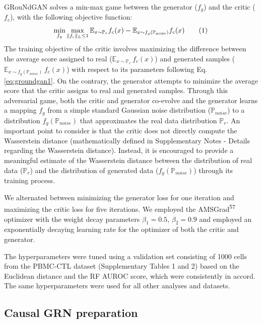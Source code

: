 GRouNdGAN solves a min-max game between the generator (${f}_{g}$) and the critic (${f}_{c}$), with the following objective function:
\begin{equation} 
\min_{f_g} \max_{\| f_c \|_L \le 1} 
\mathbb{E}_{x \sim \mathbb{P}_r} f_c(x) - 
\mathbb{E}_{x \sim f_g(\mathbb{P}_{\rm noise})} f_c(x)
\tag{1}\label{eq:groundgan1} 
\end{equation}
The training objective of the critic involves maximizing the difference between the average score assigned to real (${{\mathbb{E}}}_{x \sim {{\mathbb{P}}}_{r}} \, {f}_{c}\left(x\right)$) and generated samples (${{\mathbb{E}}}_{x \sim {f}_{g}\left({{\mathbb{P}}}_{{noise}}\right)} \, {f}_{c}\left(x\right)$) with respect to its parameters following Eq. \eqref{eq:groundgan1}. On the contrary, the generator attempts to minimize the average score that the critic assigns to real and generated samples. Through this adversarial game, both the critic and generator co-evolve and the generator learns a mapping ${f}_{g}$ from a simple standard Gaussian noise distribution (${{\mathbb{P}}}_{{noise}}$) to a distribution ${f}_{g}\left({{\mathbb{P}}}_{{noise}}\right)$ that approximates the real data distribution ${{\mathbb{P}}}_{r}$. An important point to consider is that the critic does not directly compute the Wasserstein distance (mathematically defined in Supplementary Notes - Details regarding the Wasserstein distance). Instead, it is encouraged to provide a meaningful estimate of the Wasserstein distance between the distribution of real data (${{\mathbb{P}}}_{r}$) and the distribution of generated data (${f}_{g}\left({{\mathbb{P}}}_{{noise}}\right)$) through its training process.

We alternated between minimizing the generator loss for one iteration and maximizing the critic loss for five iterations. We employed the AMSGrad\textsuperscript{57} optimizer with the weight decay parameters ${\beta }_{1}=0.5$, ${\beta }_{2}=0.9$ and employed an exponentially decaying learning rate for the optimizer of both the critic and generator.

The hyperparameters were tuned using a validation set consisting of 1000 cells from the PBMC-CTL dataset (Supplementary Tables 1 and 2) based on the Euclidean distance and the RF AUROC score, which were consistently in accord. The same hyperparameters were used for all other analyses and datasets.

\subsection*{Causal GRN preparation}

